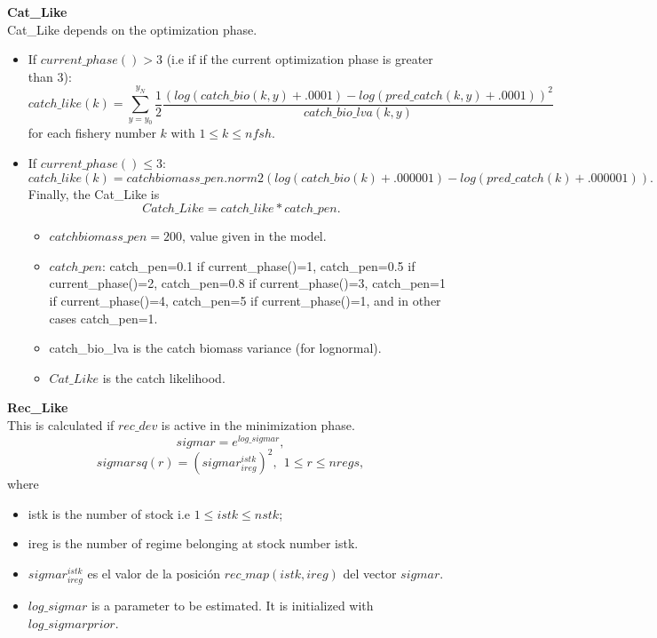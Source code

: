 \documentclass{article}
\begin{document}
\textbf{Cat\_Like}\\

Cat\_Like depends on the optimization phase.
\begin{itemize}
    \item If $current\_phase()>3$ (i.e if if the current optimization phase is greater than 3):
    \begin{equation}
        catch\_like(k) = \sum_{y=y_0}^{y_N}\dfrac{1}{2}\dfrac{(log(catch\_bio(k,y)+.0001) - log(pred\_catch(k,y)+.0001) )^2}{catch\_bio\_lva(k,y)}
    \end{equation}
    for each fishery number $k$ with $1\leq k \leq nfsh$.
    \item If $current\_phase()\leq 3$:
    \begin{equation}
        catch\_like(k) =  catchbiomass\_pen.norm2(log(catch\_bio(k)   
                      +.000001) - log(pred\_catch(k) +.000001)).
    \end{equation}
    Finally, the Cat\_Like is
    \begin{equation}
        Catch\_Like = catch\_like*catch\_pen.
    \end{equation}
    \begin{itemize}
        \item $catchbiomass\_pen=200$, value given in the model.
        \item $catch\_pen$: catch\_pen=0.1 if current\_phase()=1, catch\_pen=0.5 if current\_phase()=2, catch\_pen=0.8 if current\_phase()=3, catch\_pen=1 if current\_phase()=4, catch\_pen=5 if current\_phase()=1, and in other cases catch\_pen=1.
        \item catch\_bio\_lva is the catch biomass variance (for lognormal).
        \item $Cat\_Like$ is the catch likelihood.
    \end{itemize}
\end{itemize}

\textbf{Rec\_Like}\\
This is calculated if $rec\_dev$ is active in the minimization phase.\\
\begin{equation}
    sigmar=e^{log\_sigmar},
\end{equation}
\begin{equation}
    sigmarsq(r)=(sigmar^{istk}_{ireg})^2, \ \ 1\leq r \leq nregs,
\end{equation}
where
\begin{itemize}
    \item istk is the number of stock i.e $1\leq istk \leq nstk$;
    \item ireg is the number of regime belonging at stock number istk. 
    \item $sigmar^{istk}_{ireg}$ es el valor de la posición $rec\_map(istk,ireg)$ del vector $sigmar$.
    \item $log\_sigmar$ is a parameter to be estimated. It is initialized with $log\_sigmarprior$.
\end{itemize}
\end{document}
